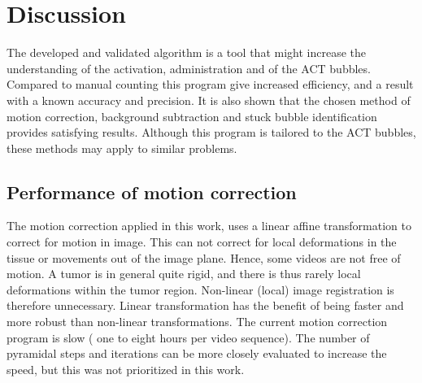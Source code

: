 \section{Discussion}
The developed and validated algorithm is a tool that might increase the understanding of the activation, administration and \texttrademark{} of the ACT\texttrademark{} bubbles. Compared to manual counting this program give increased efficiency, and a result with a known accuracy and precision. It is also shown that the chosen method of motion correction, background subtraction and stuck bubble identification provides satisfying results. Although this program is tailored to the ACT\texttrademark{} bubbles, these methods may apply to similar problems.
\subsection{Performance of motion correction}
The motion correction applied in this work, uses a linear affine transformation to correct for motion in image. This can not correct for local deformations in the tissue or movements out of the image plane. Hence, some videos are not free of motion. A tumor is in general quite rigid, and there is thus rarely local deformations within the tumor region. Non-linear (local) image registration is therefore unnecessary. Linear transformation has the benefit of being faster and more robust than non-linear transformations. The current motion correction program is slow ( one to eight hours per video sequence).  The number of pyramidal steps and iterations can be more closely evaluated to increase the speed, but this was not prioritized in this work. 

